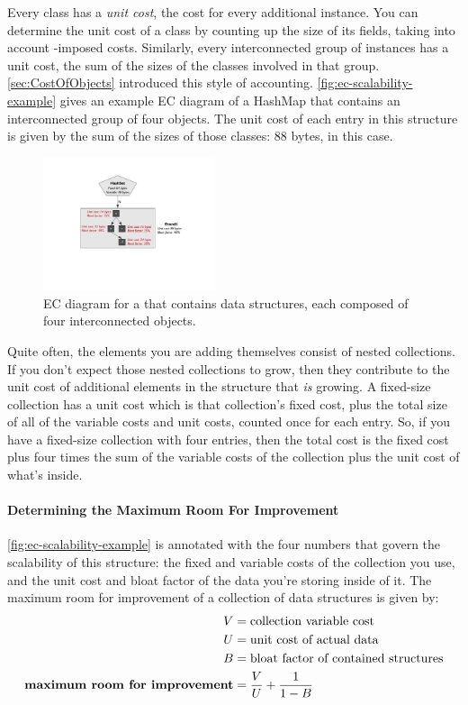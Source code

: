 Every class has a \emph{unit cost}, the cost for every additional instance. You
can determine the unit cost of a class by counting up the size of its fields,
taking into account \jre-imposed costs. Similarly, every interconnected group of
instances has a unit cost, the sum of the sizes of the classes involved in that
group. \autoref{sec:CostOfObjects} introduced this style of accounting.
\autoref{fig:ec-scalability-example} gives an example EC diagram of a HashMap
that contains an interconnected group of four objects. The unit cost of each
entry in this structure is given by the sum of the sizes of those classes: 88
bytes, in this case.
\begin{figure}
\centering
\includegraphics[width=0.45\textwidth]{part3/Figures/assessing/EC-example}
\caption{EC diagram for a  that contains data structures, each
composed of four interconnected objects.}
\label{fig:ec-scalability-example}
\end{figure}

Quite often, the elements you are adding themselves consist of nested
collections. If you don't expect those nested collections to grow, then they
contribute to the unit cost of additional elements in the structure that
\emph{is} growing. A fixed-size collection has a unit cost which is that
collection's fixed cost, plus the total size of all of the variable costs and
unit costs, counted once for each entry. So, if you have a fixed-size collection
with four entries, then the total cost is the fixed cost plus four times the sum
of the variable costs of the collection plus the unit cost of what's inside.


\paragraph{Determining the Maximum Room For Improvement}
\autoref{fig:ec-scalability-example} is annotated with the four numbers that
govern the scalability of this structure: the fixed and variable costs of the
collection you use, and the unit cost and bloat factor of the data you're
storing inside of it. The maximum room for improvement of a
collection of data structures is given by:
\begin{align*}
V &= \textrm{collection variable cost} \\
U &= \textrm{unit cost of actual data} \\
B &= \textrm{bloat factor of contained structures} \\
\textbf{\textrm{maximum room for improvement}} &= \frac{V}{U} + \frac{1}{1-B}
\end{align*}

